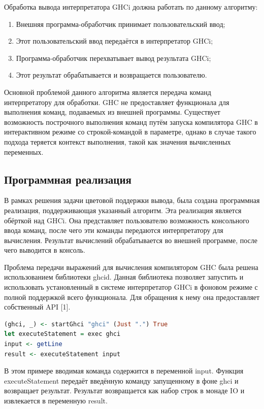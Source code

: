 Обработка вывода интерпретатора GHCi должна работать по данному алгоритму:
\begin{enumerate}
  \item Внешняя программа-обработчик принимает пользовательский ввод;
  \item Этот пользовательский ввод передаётся в интерпретатор GHCi;
  \item Программа-обработчик перехватывает вывод результата GHCi;
  \item Этот результат обрабатывается и возвращается пользователю.
\end{enumerate}

Основной проблемой данного алгоритма является передача команд интерпретатору для обработки. GHC не предоставляет функционала для выполнения команд, подаваемых из внешней программы. Существует возможность построчного выполнения команд путём запуска компилятора GHC в интерактивном режиме со строкой-командой в параметре, однако в случае такого подхода теряется контекст выполнения, такой как значения вычисленных переменных.

\subsection{Программная реализация}
В рамках решения задачи цветовой поддержки вывода, была создана программная реализация, поддерживающая указанный алгоритм. Эта реализация является обёрткой над GHCi. Она представляет пользователю возможность консольного ввода команд, после чего эти команды передаются интерпретатору для вычисления. Результат вычислений обрабатывается во внешней программе, после чего выводится в консоль.

Проблема передачи выражений для вычисления компилятором GHC была решена использованием библиотеки ghcid. Данная библиотека позволяет запустить и использовать установленный в системе интерпретатор GHCi в фоновом режиме с полной поддержкой всего функционала. Для обращения к нему она предоставляет собственный API [1].

\newpage

\begin{lstlisting}[language=Haskell, caption=Пример выполнения входной строки с помощью ghcid]
(ghci, _) <- startGhci "ghci" (Just ".") True
let executeStatement = exec ghci
input <- getLine
result <- executeStatement input
\end{lstlisting}

В этом примере вводимая команда содержится в переменной input. Функция executeStatement передаёт введённую команду запущенному в фоне ghci и возвращает результат. Результат возвращается как набор строк в монаде IO и извлекается в переменную result.

